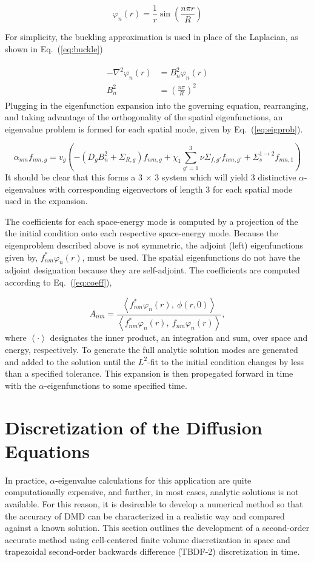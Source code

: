 \documentclass[12pt]{article}
\newcommand{\fn}[1]{\left( #1 \right)}
\newcommand{\ave}[1]{\left\langle #1 \right\rangle}
\newcommand{\bea}{\begin{eqnarray}}
\newcommand{\eea}{\end{eqnarray}}
\newcommand{\be}{\begin{equation}}
\newcommand{\ee}{\end{equation}}
\newcommand{\LEQ}[1]{\label{eq:#1}}
\newcommand{\EQ}[1]{Eq.~(\ref{eq:#1})}
\begin{document}
\be
	\varphi_n(r) = \frac{1}{r} \sin\fn{ \frac{n \pi r}{R} }
\LEQ{eigfunc} \ee

For simplicity, the buckling approximation is used in place of the Laplacian, as shown in \EQ{buckle}

\bea \begin{aligned}
	- \nabla^2 \varphi_n(r) &= B_n^2 \varphi_n(r) \\
	B_n^2 &= \fn{ \frac{n \pi}{R} }^2
\end{aligned} \LEQ{buckle} \eea
Plugging in the eigenfunction expansion into the governing equation, rearranging, and taking advantage of the 
orthogonality of the spatial eigenfunctions, an eigenvalue problem is formed for each spatial mode, given by \EQ{eigprob}.

\be
	\alpha_{nm} f_{nm, g} = v_g \fn{ - \fn{ D_g B_n^2 + \Sigma_{R,g} }f_{nm, g} + \chi_1 \sum_{g' = 1}^{3} \nu\Sigma_{f,g'} f_{nm, g'} 
	+ \Sigma_s^{1 \rightarrow 2} f_{nm, 1} } 
\LEQ{eigprob} \ee
It should be clear that this forms a 3 $\times$ 3 system which will yield 3 distinctive $\alpha$-eigenvalues 
with corresponding eigenvectors of length 3 for each spatial mode used in the expansion.

The coefficients for each space-energy mode is computed by a projection of the the initial condition
onto each respective space-energy mode. 
Because the eigenproblem described above is not symmetric, the adjoint (left) eigenfunctions given by, 
$f_{nm}^* \varphi_n(r)$, must be used. 
The spatial eigenfunctions do not have the adjoint designation because they are self-adjoint. 
The coefficients are computed according to \EQ{coeff},

\be
	A_{nm} = \frac{\ave{ f_{nm}^* \varphi_n(r), \ \phi(r, 0)}}{\ave{f_{nm}^* \varphi_n(r), \ f_{nm} \varphi_n(r)}},
\LEQ{coeff} \ee
where $\ave{\cdot}$ designates the inner product, an integration and sum, over space and energy, respectively. 
To generate the full analytic solution modes are generated and added to the solution until the $L^2$-fit to the initial condition 
changes by less than a specified tolerance. 
This expansion is then propegated forward in time with the $\alpha$-eigenfunctions to some specified  time.

\section{Discretization of the Diffusion Equations}
In practice,  $\alpha$-eigenvalue calculations for this application are quite computationally expensive, and  further, 
in most cases, analytic solutions is not available. 
For this reason, it is desireable to develop a numerical method so that the accuracy of DMD can be characterized in a realistic way
and compared against a known solution. 
This section outlines the development of a second-order accurate method using cell-centered finite volume discretization in space 
and trapezoidal second-order backwards difference (TBDF-2) discretization in time.
\end{document}
